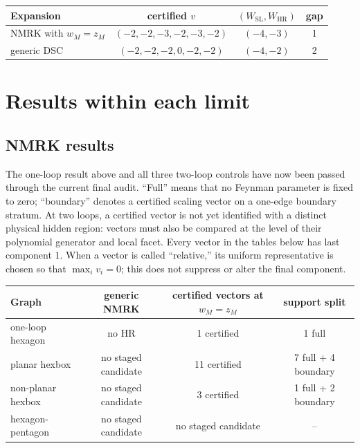 \documentclass[11pt]{article}
\newcommand{\SL}{\mathrm{SL}}
\newcommand{\HR}{\mathrm{HR}}
\begin{document}
\begin{center}
\begin{tabular}{@{}lccc@{}}
\toprule
Expansion & certified \(v\) & \((W_{\SL},W_{\HR})\) & gap\\
\midrule
NMRK with \(w_M=z_M\) & \((-2,-2,-3,-2,-3,-2)\) & \((-4,-3)\) & 1\\
generic DSC & \((-2,-2,-2,0,-2,-2)\) & \((-4,-2)\) & 2\\
\bottomrule
\end{tabular}
\end{center}

\section{Results within each limit}

\subsection{NMRK results}

The one-loop result above and all three two-loop controls have now been
passed through the current final audit.  ``Full'' means that no Feynman
parameter is fixed to zero; ``boundary'' denotes a certified scaling vector
on a one-edge boundary stratum.  At two loops, a certified vector is not yet
identified with a distinct physical hidden region: vectors must also be
compared at the level of their polynomial generator and local facet.
Every vector in the tables below has last component \(1\).  When a vector is
called ``relative,'' its uniform representative is chosen so that
\(\max_i v_i=0\); this does not suppress or alter the final component.

\begin{center}
\begin{tabular}{@{}lccc@{}}
\toprule
Graph & generic NMRK & certified vectors at \(w_M=z_M\) & support split\\
\midrule
one-loop hexagon & no HR & 1 certified & 1 full\\
planar hexbox & no staged candidate & 11 certified & 7 full + 4 boundary\\
non-planar hexbox & no staged candidate & 3 certified & 1 full + 2 boundary\\
hexagon-pentagon & no staged candidate & no staged candidate & --\\
\bottomrule
\end{tabular}
\end{center}
\end{document}
